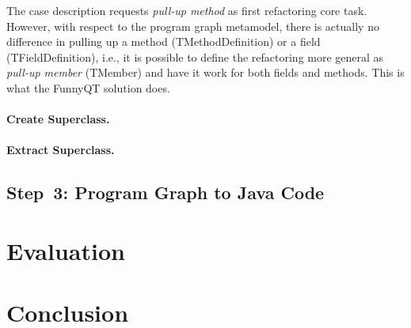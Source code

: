 \documentclass[submission]{eptcs}
\begin{document}
The case description requests \emph{pull-up method} as first refactoring core
task.  However, with respect to the program graph metamodel, there is actually
no difference in pulling up a method (\textsf{TMethodDefinition}) or a field
(\textsf{TFieldDefinition}), i.e., it is possible to define the refactoring
more general as \emph{pull-up member} (\textsf{TMember}) and have it work for
both fields and methods.  This is what the FunnyQT solution does.





\paragraph{Create Superclass.}

\paragraph{Extract Superclass.}



\subsection{Step~3: Program Graph to Java Code}
\label{sec:step-3:pg-to-java}



\section{Evaluation}
\label{sec:evaluation}


\section{Conclusion}
\label{sec:conclusion}






\end{document}
